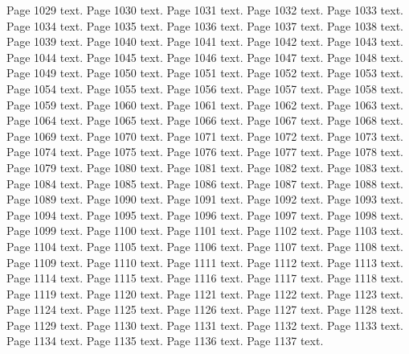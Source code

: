 \documentclass{article}
\begin{document}
Page 1029 text.\newpage
Page 1030 text.\newpage
Page 1031 text.\newpage
Page 1032 text.\newpage
Page 1033 text.\newpage
Page 1034 text.\newpage
Page 1035 text.\newpage
Page 1036 text.\newpage
Page 1037 text.\newpage
Page 1038 text.\newpage
Page 1039 text.\newpage
Page 1040 text.\newpage
Page 1041 text.\newpage
Page 1042 text.\newpage
Page 1043 text.\newpage
Page 1044 text.\newpage
Page 1045 text.\newpage
Page 1046 text.\newpage
Page 1047 text.\newpage
Page 1048 text.\newpage
Page 1049 text.\newpage
Page 1050 text.\newpage
Page 1051 text.\newpage
Page 1052 text.\newpage
Page 1053 text.\newpage
Page 1054 text.\newpage
Page 1055 text.\newpage
Page 1056 text.\newpage
Page 1057 text.\newpage
Page 1058 text.\newpage
Page 1059 text.\newpage
Page 1060 text.\newpage
Page 1061 text.\newpage
Page 1062 text.\newpage
Page 1063 text.\newpage
Page 1064 text.\newpage
Page 1065 text.\newpage
Page 1066 text.\newpage
Page 1067 text.\newpage
Page 1068 text.\newpage
Page 1069 text.\newpage
Page 1070 text.\newpage
Page 1071 text.\newpage
Page 1072 text.\newpage
Page 1073 text.\newpage
Page 1074 text.\newpage
Page 1075 text.\newpage
Page 1076 text.\newpage
Page 1077 text.\newpage
Page 1078 text.\newpage
Page 1079 text.\newpage
Page 1080 text.\newpage
Page 1081 text.\newpage
Page 1082 text.\newpage
Page 1083 text.\newpage
Page 1084 text.\newpage
Page 1085 text.\newpage
Page 1086 text.\newpage
Page 1087 text.\newpage
Page 1088 text.\newpage
Page 1089 text.\newpage
Page 1090 text.\newpage
Page 1091 text.\newpage
Page 1092 text.\newpage
Page 1093 text.\newpage
Page 1094 text.\newpage
Page 1095 text.\newpage
Page 1096 text.\newpage
Page 1097 text.\newpage
Page 1098 text.\newpage
Page 1099 text.\newpage
Page 1100 text.\newpage
Page 1101 text.\newpage
Page 1102 text.\newpage
Page 1103 text.\newpage
Page 1104 text.\newpage
Page 1105 text.\newpage
Page 1106 text.\newpage
Page 1107 text.\newpage
Page 1108 text.\newpage
Page 1109 text.\newpage
Page 1110 text.\newpage
Page 1111 text.\newpage
Page 1112 text.\newpage
Page 1113 text.\newpage
Page 1114 text.\newpage
Page 1115 text.\newpage
Page 1116 text.\newpage
Page 1117 text.\newpage
Page 1118 text.\newpage
Page 1119 text.\newpage
Page 1120 text.\newpage
Page 1121 text.\newpage
Page 1122 text.\newpage
Page 1123 text.\newpage
Page 1124 text.\newpage
Page 1125 text.\newpage
Page 1126 text.\newpage
Page 1127 text.\newpage
Page 1128 text.\newpage
Page 1129 text.\newpage
Page 1130 text.\newpage
Page 1131 text.\newpage
Page 1132 text.\newpage
Page 1133 text.\newpage
Page 1134 text.\newpage
Page 1135 text.\newpage
Page 1136 text.\newpage
Page 1137 text.\newpage
\end{document}
